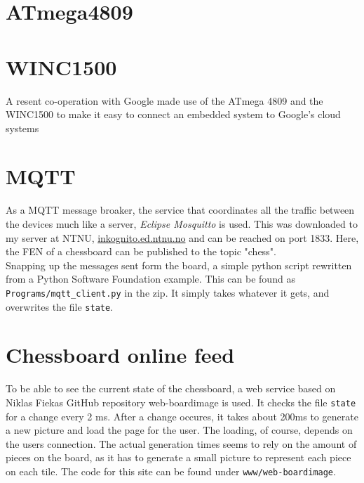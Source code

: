 \section{ATmega4809}
\cite{atmega4809}

\section{WINC1500}

A resent co-operation with Google made use of the ATmega 4809 and the WINC1500 to make it easy to connect an embedded system to Google's cloud systems 


\section{MQTT}

As a MQTT message broaker, the service that coordinates all the traffic between the devices much like a server, \textit{Eclipse Mosquitto} is used. \cite{mosquitto} This was downloaded to my server at NTNU, \url{inkognito.ed.ntnu.no} and can be reached on port 1833. Here, the FEN of a chessboard can be published to the topic "chess".\\

Snapping up the messages sent form the board, a simple python script rewritten from a Python Software Foundation example. \cite{mqttpython} This can be found as \texttt{Programs/mqtt\_client.py} in the zip. It simply takes whatever it gets, and overwrites the file \texttt{state}.\\

\section{Chessboard online feed}

To be able to see the current state of the chessboard, a web service based on Niklas Fiekas GitHub repository web-boardimage is used. \cite{Fiekas2017} It checks the file \texttt{state} for a change every 2 ms. After a change occures, it takes about 200ms to generate a new picture and load the page for the user. The loading, of course, depends on the users connection. The actual generation times seems to rely on the amount of pieces on the board, as it has to generate a small picture to represent each piece on each tile. The code for this site can be found under \texttt{www/web-boardimage}.